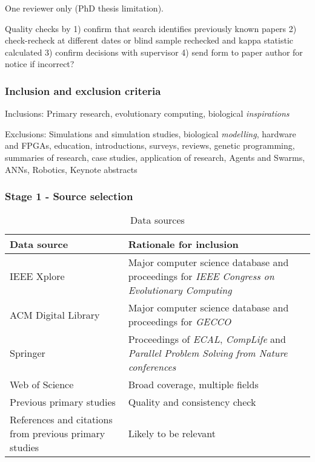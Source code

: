One reviewer only (PhD thesis limitation). 

Quality checks by 1) confirm that search identifies previously known papers 2) check-recheck at different dates or blind sample rechecked and kappa statistic calculated 3) confirm decisions with supervisor 4) send form to paper author for notice if incorrect?

\subsubsection{Inclusion and exclusion criteria}
Inclusions: Primary research, evolutionary computing, biological \emph{inspirations}

Exclusions: Simulations and simulation studies, biological \emph{modelling}, hardware and FPGAs, education, introductions, surveys, reviews, genetic programming, summaries of research, case studies, application of research, Agents and Swarms, ANNs, Robotics, Keynote abstracts

\subsubsection{Stage 1 - Source selection}

\begin{table}
	\footnotesize
	\begin{center}
		\begin{tabular}{@{}p{5cm}p{8cm}@{}}
			\toprule
			Data source & Rationale for inclusion\\
			\midrule
			IEEE Xplore & Major computer science database and proceedings for \textit{IEEE Congress on Evolutionary Computing}\\
			ACM Digital Library & Major computer science database and proceedings for \textit{GECCO}\\
			Springer & Proceedings of \textit{ECAL}, \textit{CompLife} and \textit{Parallel Problem Solving from Nature conferences}\\
			Web of Science & Broad coverage, multiple fields\\
			Previous primary studies & Quality and consistency check\\
			References and citations from previous primary studies & Likely to be relevant \\
			\bottomrule
		\end{tabular}
	\end{center}
	\caption{Data sources}
\end{table}

